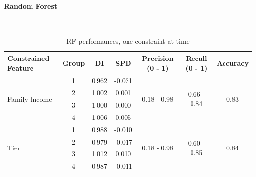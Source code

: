 \documentclass{article}
\begin{document}
\paragraph{Random Forest}\mbox{}\\
\begin{table}[H]
\caption{RF performances, one constraint at time}
\begin{tabular}{lccc|ccc}
\hline
\textbf{Constrained Feature} & \textbf{Group} & \textbf{DI} & \textbf{SPD} & \textbf{Precision (0 - 1)} & \textbf{Recall (0 - 1)} & \textbf{Accuracy} \\
\hline
\multirow{4}{*}{Family Income} & 1     & 0.962                  & -0.031                     & \multirow{4}{*}{0.18 - 0.98}                     & \multirow{4}{*}{0.66 - 0.84}                     & \multirow{4}{*}{0.83}                     \\
                               & 2     & 1.002                  & 0.001                      &                                                  &                                                  &                                           \\
                               & 3     & 1.000                  & 0.000                      &                                                  &                                                  &                                           \\
                               & 4     & 1.006                  & 0.005                      &                                                  &                                                  &                                           \\
\hline
\multirow{5}{*}{Tier}          & 1     & 0.988                  & -0.010                     & \multirow{5}{*}{0.18 - 0.98}                     & \multirow{5}{*}{0.60 - 0.85}                     & \multirow{5}{*}{0.84}                     \\
                               & 2     & 0.979                  & -0.017                     &                                                  &                                                  &                                           \\
                               & 3     & 1.012                  & 0.010                      &                                                  &                                                  &                                           \\
                               & 4     & 0.987                  & -0.011                     &                                                  &                                                  &                                           \\

\end{tabular}
\end{table}
\end{document}
